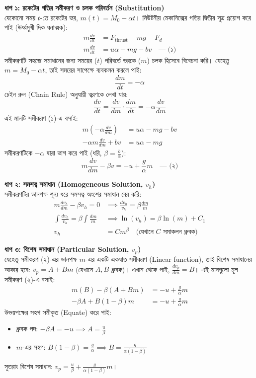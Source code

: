 \documentclass[12pt, a4paper]{article}
\begin{document}
\begin{tcolorbox}[solutionbox={সমাধান (Solution)}]
\noindent
\textbf{ধাপ ১: রকেটের গতির সমীকরণ ও চলক পরিবর্তন (Substitution)} \\
যেকোনো সময় $t$-তে রকেটের ভর, $m(t) = M_0 - \alpha t$।  
নিউটনীয় মেকানিক্সের গতির দ্বিতীয় সূত্র প্রয়োগ করে পাই (ঊর্ধ্বমুখী দিক ধনাত্মক):
\begin{align*}
    m \frac{dv}{dt} &= F_{\text{thrust}} - mg - F_d \\
    m \frac{dv}{dt} &= u \alpha - mg - bv \quad \text{--- (১)}
\end{align*}
সমীকরণটি সহজে সমাধানের জন্য সময়ের ($t$) পরিবর্তে ভরকে ($m$) চলক হিসেবে বিবেচনা করি। 
যেহেতু $m = M_0 - \alpha t$, তাই সময়ের সাপেক্ষে ব্যবকলন করলে পাই: 
\[ \frac{dm}{dt} = -\alpha \]
চেইন রুল (Chain Rule) অনুযায়ী ত্বরণকে লেখা যায়:
\[ \frac{dv}{dt} = \frac{dv}{dm} \cdot \frac{dm}{dt} = -\alpha \frac{dv}{dm} \]
এই মানটি সমীকরণ (১)-এ বসাই:
\begin{align*}
    m \left( -\alpha \frac{dv}{dm} \right) &= u \alpha - mg - bv \\
    -\alpha m \frac{dv}{dm} + bv &= u \alpha - mg
\end{align*}
সমীকরণটিকে $-\alpha$ দ্বারা ভাগ করে পাই (ধরি, $\beta = \frac{b}{\alpha}$):
\[ m \frac{dv}{dm} - \beta v = -u + \frac{g}{\alpha} m \quad \text{--- (২)} \]

\vspace{0.5em}
\noindent
\textbf{ধাপ ২: সমসত্ব সমাধান (Homogeneous Solution, $v_h$)} \\
সমীকরণটির ডানপক্ষ শূন্য ধরে সমসত্ব অংশের সমাধান বের করি:
\begin{align*}
    m \frac{dv_h}{dm} - \beta v_h = 0 &\implies \frac{dv_h}{v_h} = \beta \frac{dm}{m} \\
    \int \frac{dv_h}{v_h} = \beta \int \frac{dm}{m} &\implies \ln(v_h) = \beta \ln(m) + C_1 \\
    v_h &= C m^\beta \quad \text{(যেখানে $C$ সমাকলন ধ্রুবক)}
\end{align*}

\vspace{0.5em}
\noindent
\textbf{ধাপ ৩: বিশেষ সমাধান (Particular Solution, $v_p$)} \\
যেহেতু সমীকরণ (২)-এর ডানপক্ষ $m$-এর একটি একঘাত সমীকরণ (Linear function), তাই বিশেষ সমাধানের আকার হবে: $v_p = A + Bm$ (যেখানে $A, B$ ধ্রুবক)। 
এখান থেকে পাই, $\frac{dv_p}{dm} = B$। এই মানগুলো মূল সমীকরণ (২)-এ বসাই:
\begin{align*}
    m (B) - \beta (A + Bm) &= -u + \frac{g}{\alpha} m \\
    -\beta A + B(1 - \beta)m &= -u + \frac{g}{\alpha} m
\end{align*}
উভয়পক্ষের সহগ সমীকৃত (Equate) করে পাই:
\begin{itemize}[leftmargin=*, parsep=0.5ex]
    \item ধ্রুবক পদ: $-\beta A = -u \implies A = \frac{u}{\beta}$
    \item $m$-এর সহগ: $B(1 - \beta) = \frac{g}{\alpha} \implies B = \frac{g}{\alpha(1 - \beta)}$
\end{itemize}
সুতরাং বিশেষ সমাধান: $v_p = \frac{u}{\beta} + \frac{g}{\alpha(1 - \beta)} m$।


\end{tcolorbox}
\end{document}
